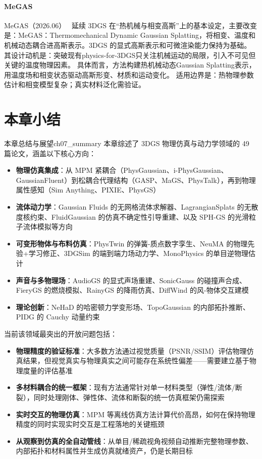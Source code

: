\paragraph{MeGAS}
MeGAS（2026.06）~\cite{2606_23455} 延续 3DGS 在“热机械与相变高斯”上的基本设定，主要改变是：MeGAS：Thermomechanical Dynamic Gaussian Splatting，将相变、温度和机械动态耦合进高斯表示。3DGS 的显式高斯表示和可微渲染能力保持为基础。
其设计动机是：突破现有physics-for-3DGS只关注机械运动的局限，引入不可见但关键的温度物理因素。
具体而言，方法构建热机械动态Gaussian Splatting表示，用温度场和相变状态驱动高斯形变、材质和运动变化。
适用边界是：热物理参数估计和相变模型复杂；真实材料泛化需验证。



\section*{本章小结}

\begin{futurebox}{本章总结与展望}{ch07_summary}
本章综述了 3DGS 物理仿真与动力学领域的 49 篇论文，涵盖以下核心方向：
\begin{itemize}
\item \textbf{物理仿真集成}：从 MPM 紧耦合（PhysGaussian、i-PhysGaussian、GaussianFluent）到松耦合代理结构（GASP、MaGS、PhysTalk），再到物理属性感知（Sim Anything、PIXIE、PhysGS）
\item \textbf{流体动力学}：Gaussian Fluids 的无网格流体求解器、LagrangianSplats 的无散度核约束、FluidGaussian 的仿真不确定性引导重建、以及 SPH-GS 的光滑粒子流体模拟等方向
\item \textbf{可变形物体与布料仿真}：PhysTwin 的弹簧-质点数字孪生、NeuMA 的物理先验+学习修正、3DGSim 的端到端力场动力学、MonoPhysics 的单目逆物理估计
\item \textbf{声音与多物理场}：AudioGS 的显式声场重建、SonicGauss 的碰撞声合成、FieryGS 的燃烧模拟、RainyGS 的降雨仿真、DiffWind 的风-物体交互建模
\item \textbf{理论创新}：NeHaD 的哈密顿力学变形场、TopoGaussian 的内部拓扑推断、PIDG 的 Cauchy 动量约束
\end{itemize}

当前该领域最突出的开放问题包括：
\begin{itemize}
\item \textbf{物理精度的验证标准}：大多数方法通过视觉质量（PSNR/SSIM）评估物理仿真结果，但视觉真实与物理真实之间可能存在系统性偏差——需要建立基于物理度量的评估基准
\item \textbf{多材料耦合的统一框架}：现有方法通常针对单一材料类型（弹性/流体/断裂），同时处理刚体、弹性体、流体和断裂的统一仿真框架仍需探索
\item \textbf{实时交互的物理仿真}：MPM 等离线仿真方法计算代价高昂，如何在保持物理精度的同时实现实时交互是工程落地的关键瓶颈
\item \textbf{从观察到仿真的全自动管线}：从单目/稀疏视角视频自动推断完整物理参数、内部拓扑和材料属性并生成仿真就绪资产，仍是长期目标
\end{itemize}
\end{futurebox}
